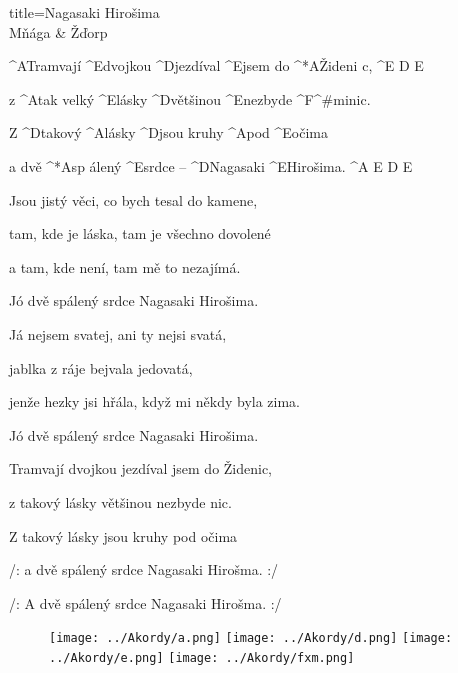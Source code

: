 \begin{song}{title=\predtitle\centering Nagasaki Hirošima \\\large Mňága \&  Žďorp  \vspace*{-0.3cm}}  %
\begin{centerjustified}
\nejnejvetsi

\sloka
	^{A\z }Tramvají ^{E\z }dvojkou ^{D\z }jezdíval ^{E}jsem do ^*{\z A}Žideni c, ^{E\,\,D\,\,E}

	z ^{A}tak velký ^{E\z }lásky ^{D\z}většinou ^{E\z }nezbyde ^{F^{\#}mi\z }nic.~~~

	Z ^{D\z }takový ^{A\z}lásky ^{D\z}jsou kruhy ^{A\z}pod ^{\z E}očima

	a dvě ^*{A}sp álený ^{E\z }srdce -- ^{D\z }Nagasaki ^{E\z}Hirošima. ^{A\,\,E\,\,D\,\,E}

\sloka
	Jsou jistý věci, co bych tesal do kamene,
	
	tam, kde je láska, tam je všechno dovolené
	
	a tam, kde není, tam mě to nezajímá.
	
	Jó dvě spálený srdce Nagasaki Hirošima.

\sloka
	Já nejsem svatej, ani ty nejsi svatá,
	
	jablka z ráje bejvala jedovatá,
	
	jenže hezky jsi hřála, když mi někdy byla zima.
	
	Jó dvě spálený srdce Nagasaki Hirošima.

\sloka
	Tramvají dvojkou jezdíval jsem do Židenic,
	
	z takový lásky většinou nezbyde nic.
	
	Z takový lásky jsou kruhy pod očima

	/: a dvě spálený srdce Nagasaki Hirošma. :/
	
	/: A dvě spálený srdce Nagasaki Hirošma. :/

\end{centerjustified}
\setcounter{Slokočet}{0}
\end{song}


\begin{figure}[h]
\predtitle\centering
\texttt{[image: ../Akordy/a.png]}
\texttt{[image: ../Akordy/d.png]}
\texttt{[image: ../Akordy/e.png]}
\texttt{[image: ../Akordy/fxm.png]}
\end{figure}
